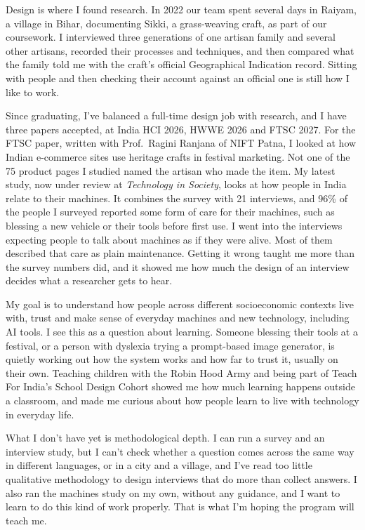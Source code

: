 \documentclass[11pt,letterpaper]{article}
\begin{document}
Design is where I found research. In 2022 our team spent several days in Raiyam, a village in Bihar, documenting Sikki, a grass-weaving craft, as part of our coursework. I interviewed three generations of one artisan family and several other artisans, recorded their processes and techniques, and then compared what the family told me with the craft's official Geographical Indication record. Sitting with people and then checking their account against an official one is still how I like to work.

Since graduating, I've balanced a full-time design job with research, and I have three papers accepted, at India HCI 2026, HWWE 2026 and FTSC 2027. For the FTSC paper, written with Prof.~Ragini Ranjana of NIFT Patna, I looked at how Indian e-commerce sites use heritage crafts in festival marketing. Not one of the 75 product pages I studied named the artisan who made the item. My latest study, now under review at \textit{Technology in Society}, looks at how people in India relate to their machines. It combines the survey with 21 interviews, and 96\% of the people I surveyed reported some form of care for their machines, such as blessing a new vehicle or their tools before first use. I went into the interviews expecting people to talk about machines as if they were alive. Most of them described that care as plain maintenance. Getting it wrong taught me more than the survey numbers did, and it showed me how much the design of an interview decides what a researcher gets to hear.

My goal is to understand how people across different socioeconomic contexts live with, trust and make sense of everyday machines and new technology, including AI tools. I see this as a question about learning. Someone blessing their tools at a festival, or a person with dyslexia trying a prompt-based image generator, is quietly working out how the system works and how far to trust it, usually on their own. Teaching children with the Robin Hood Army and being part of Teach For India's School Design Cohort showed me how much learning happens outside a classroom, and made me curious about how people learn to live with technology in everyday life.

What I don't have yet is methodological depth. I can run a survey and an interview study, but I can't check whether a question comes across the same way in different languages, or in a city and a village, and I've read too little qualitative methodology to design interviews that do more than collect answers. I also ran the machines study on my own, without any guidance, and I want to learn to do this kind of work properly. That is what I'm hoping the program will teach me.
\end{document}
